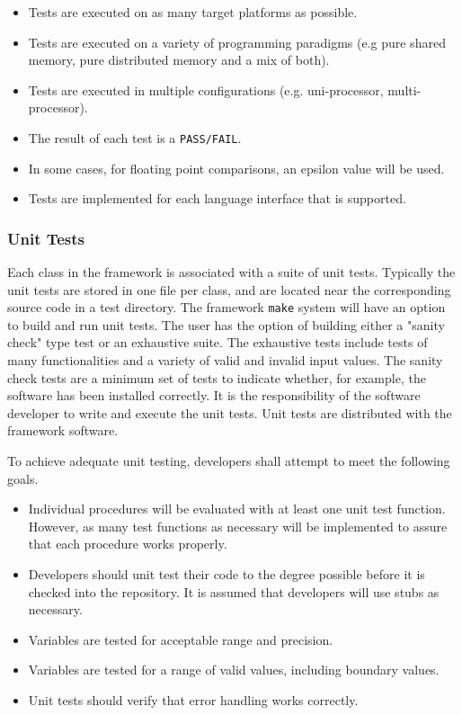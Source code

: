 \begin{itemize}
\item Tests are executed on as many target platforms as possible. 
\item Tests are executed on a variety of programming paradigms
(e.g pure shared memory, pure distributed memory and a mix of both).
\item Tests are executed in multiple configurations (e.g. uni-processor,
multi-processor).
\item The result of each test is a {\tt PASS/FAIL}.  
\item In some cases, for floating point comparisons, an epsilon value
will be used.
\item Tests are implemented for each language interface that is 
supported.
\end{itemize}

\subsubsection{Unit Tests}

Each class in the framework is associated with a suite of unit tests.
Typically the unit tests are stored in one file per class, and are
located near the corresponding source code in a test directory.  The 
framework {\tt make} system will have an option to build and run unit tests.
The user has the option of building either a "sanity check" type test
or an exhaustive suite. The exhaustive tests include tests of many 
functionalities and a variety of valid and invalid input values. The sanity 
check tests are a minimum set of tests to indicate whether, for example, the 
software has been installed correctly. It is the responsibility of the 
software developer to write and execute the unit tests. Unit tests 
are distributed with the framework software.

To achieve adequate unit testing, developers shall attempt to meet the following goals. 

\begin{itemize}
\item Individual procedures will be evaluated with at least one unit
test function.  However, as many test functions as necessary will be
implemented to assure that each procedure works properly.  
\item Developers should unit test their code to the degree possible  
before it is checked into the repository.  It is assumed that 
developers will use stubs as necessary.
\item Variables are tested for acceptable range and precision.
\item Variables are tested for a range of valid values, including boundary
values.
\item Unit tests should verify that error handling works correctly.
\end{itemize}

